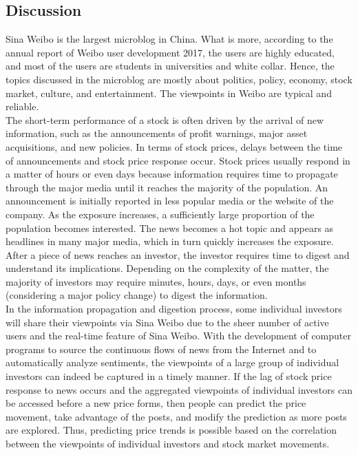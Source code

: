 \documentclass[review,3p,times,12pt,number]{elsarticle}
\begin{document}
\subsection{Discussion}
\label{sect:result}
\vspace{5mm}
Sina Weibo is the largest microblog in China. What is more, according to the annual report of Weibo user development 2017, the users are highly educated, and most of the users are students in universities and white collar. Hence, the topics discussed in the microblog are mostly about politics, policy, economy, stock market, culture, and entertainment. The viewpoints in Weibo are typical and reliable.\\
\indent
The short-term performance of a stock is often driven by the arrival of new information, such as the announcements of profit warnings, major asset acquisitions, and new policies. In terms of stock prices, delays between the time of announcements and stock price response occur. Stock prices usually respond in a matter of hours or even days because information requires time to propagate through the major media until it reaches the majority of the population. An announcement is initially reported in less popular media or the website of the company. As the exposure increases, a sufficiently large proportion of the population becomes interested. The news becomes a hot topic and appears as headlines in many major media, which in turn quickly increases the exposure. After a piece of news reaches an investor, the investor requires time to digest and understand its implications. Depending on the complexity of the matter, the majority of investors may require minutes, hours, days, or even months (considering a major policy change) to digest the information.\\
\indent
In the information propagation and digestion process, some individual investors will share their viewpoints via Sina Weibo due to the sheer number of active users and the real-time feature of Sina Weibo. With the development of computer programs to source the continuous flows of news from the Internet and to automatically analyze sentiments, the viewpoints of a large group of individual investors can indeed be captured in a timely manner. If the lag of stock price response to news occurs and the aggregated viewpoints of individual investors can be accessed before a new price forms, then people can predict the price movement, take advantage of the posts, and modify the prediction as more posts are explored. Thus, predicting price trends is possible based on the correlation between the viewpoints of individual investors and stock market movements.
\end{document}
